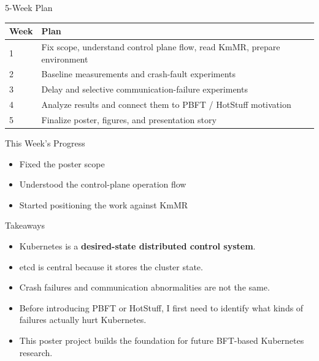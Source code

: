 \documentclass{beamer}
\begin{document}
\begin{frame}{5-Week Plan}
\begin{table}
\centering
\small
\begin{tabular}{p{1.2cm} p{9.4cm}}
\toprule
\textbf{Week} & \textbf{Plan} \\
\midrule
1 & Fix scope, understand control plane flow, read KmMR, prepare environment \\
2 & Baseline measurements and crash-fault experiments \\
3 & Delay and selective communication-failure experiments \\
4 & Analyze results and connect them to PBFT / HotStuff motivation \\
5 & Finalize poster, figures, and presentation story \\
\bottomrule
\end{tabular}
\end{table}

\vspace{0.3cm}
\begin{block}{This Week's Progress}
\begin{itemize}
    \item Fixed the poster scope
    \item Understood the control-plane operation flow
    \item Started positioning the work against KmMR
\end{itemize}
\end{block}
\end{frame}

\begin{frame}{Takeaways}
\begin{itemize}
    \item Kubernetes is a \textbf{desired-state distributed control system}.
    \item etcd is central because it stores the cluster state.
    \item Crash failures and communication abnormalities are not the same.
    \item Before introducing PBFT or HotStuff, I first need to identify what kinds of failures actually hurt Kubernetes.
    \item This poster project builds the foundation for future BFT-based Kubernetes research.
\end{itemize}
\end{frame}
\end{document}
